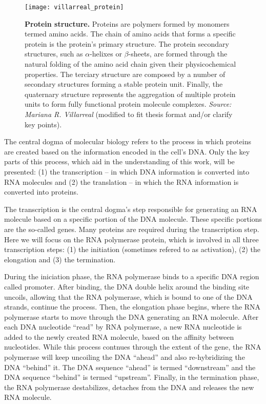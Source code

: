 \begin{figure}[h!]
\centering
\texttt{[image: villarreal\_protein]}
\caption[Protein structure]{\textbf{Protein structure.} Proteins are polymers formed by monomers termed amino acids. The chain of amino acids that forms a specific protein is the protein's primary structure. The protein secondary structures, such as $\alpha$-helixes or $\beta$-sheets, are formed through the natural folding of the amino acid chain given their physicochemical properties. The terciary structure are composed by a number of secondary structures forming a stable protein unit. Finally, the quaternary structure represents the aggregation of multiple protein units to form fully functional protein molecule complexes. \emph{Source: Mariana R. Villarreal} (modified to fit thesis format and/or clarify key points).}
\label{fig:villarreal_protein}
\end{figure}

The central dogma of molecular biology refers to the process in which proteins are created based on the information encoded in the cell's DNA. Only the key parts of this process, which aid in the understanding of this work, will be presented: (1) the transcription -- in which DNA information is converted into RNA molecules and (2) the translation -- in which the RNA information is converted into proteins.

The transcription is the central dogma's step responsible for generating an RNA molecule based on a specific portion of the DNA molecule. These specific portions are the so-called genes. Many proteins are required during the transcription step. Here we will focus on the RNA polymerase protein, which is involved in all three transcription steps: (1) the initiation (sometimes refered to as activation), (2) the elongation and (3) the termination.

During the iniciation phase, the RNA polymerase binds to a specific DNA region called promoter. After binding, the DNA double helix around the binding site uncoils, allowing that the RNA polymerase, which is bound to one of the DNA strands, continue the process. Then, the elongation phase begins, where the RNA polymerase starts to move through the DNA generating an RNA molecule. After each DNA nucleotide ``read'' by RNA polymerase, a new RNA nucleotide is added to the newly created RNA molecule, based on the affinity between nucleotides. While this process contnues through the extent of the gene, the RNA polymerase will keep uncoiling the DNA ``ahead'' and also re-hybridizing the DNA ``behind'' it. The DNA sequence ``ahead'' is termed ``downstream'' and the DNA sequence ``behind'' is termed ``upstream''. Finally, in the termination phase, the RNA polymerase destabilizes, detaches from the DNA and releases the new RNA molecule.


